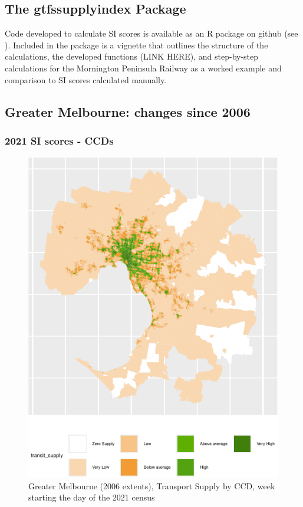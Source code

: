 \documentclass[preprint, 3p,
authoryear]{elsarticle} %
\begin{document}
\subsection{The gtfssupplyindex
Package}\label{the-gtfssupplyindex-package}

Code developed to calculate SI scores is available as an R package on
github (see \citet{gtfssupplyindex_github}). Included in the package is
a vignette that outlines the structure of the calculations, the
developed functions (LINK HERE), and step-by-step calculations for the
Mornington Peninsula Railway as a worked example and comparison to SI
scores calculated manually.

\subsection{Greater Melbourne: changes since
2006}\label{greater-melbourne-changes-since-2006}

\subsubsection{2021 SI scores - CCDs}\label{si-scores---ccds}

\begin{figure}
\includegraphics[width=1\linewidth]{Leveraging_GTFS_to_assess_transit_supply_Transport_Geography_files/figure-latex/Greater_Melbourne_CCD_2021-1} \caption{Greater Melbourne (2006 extents), Transport Supply by CCD, week starting the day of the 2021 census}\label{fig:Greater_Melbourne_CCD_2021}
\end{figure}
\end{document}
